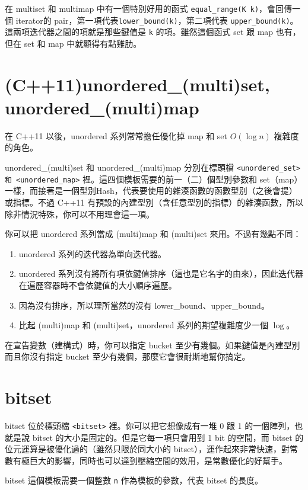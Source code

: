 \documentclass[a4paper, 11pt, oneside]{book}
\begin{document}
在 multiset 和 multimap 中有一個特別好用的函式 \texttt{equal\_range(K k)}，會回傳一個 iterator的 pair，第一項代表\texttt{lower\_bound(k)}，第二項代表 \texttt{upper\_bound(k)}。這兩項迭代器之間的項就是那些鍵值是 \texttt{k} 的項。雖然這個函式 set 跟 map 也有，但在 set 和 map 中就顯得有點雞肋。

\section{(C++11)unordered\_(multi)set, unordered\_(multi)map}
在 C++11 以後，unordered 系列常常擔任優化掉 map 和 set $O(\log n)$ 複雜度的角色。

unordered\_(multi)set 和 unordered\_(multi)map 分別在標頭檔 \texttt{<unordered\_set> 和 <unordered\_map>} 裡。這四個模板需要的前一（二）個型別參數和 set（map）一樣，而接著是一個型別Hash，代表要使用的雜湊函數的函數型別（之後會提）或指標。不過 C++11 有預設的內建型別（含任意型別的指標）的雜湊函數，所以除非情況特殊，你可以不用理會這一項。

你可以把 unordered 系列當成 (multi)map 和 (multi)set 來用。不過有幾點不同：
\begin{enumerate}
    \item unordered 系列的迭代器為單向迭代器。
    \item unordered 系列沒有將所有項依鍵值排序（這也是它名字的由來），因此迭代器在遍歷容器時不會依鍵值的大小順序遍歷。
    \item 因為沒有排序，所以理所當然的沒有 lower\_bound、upper\_bound。
    \item 比起 (multi)map 和 (multi)set，unordered 系列的期望複雜度少一個 $\log$。
\end{enumerate}

在宣告變數（建構式）時，你可以指定 bucket 至少有幾個。如果鍵值是內建型別而且你沒有指定 bucket 至少有幾個，那麼它會很耐斯地幫你搞定。

\section{bitset}

bitset 位於標頭檔 \texttt{<bitset>} 裡。你可以把它想像成有一堆 0 跟 1 的一個陣列，也就是說 bitset 的大小是固定的。但是它每一項只會用到 1 bit 的空間，而 bitset 的位元運算是被優化過的（雖然只限於同大小的 bitset），運作起來非常快速，對常數有極巨大的影響，同時也可以達到壓縮空間的效用，是常數優化的好幫手。

bitset 這個模板需要一個整數 \texttt{n} 作為模板的參數，代表 bitset 的長度。
\end{document}
